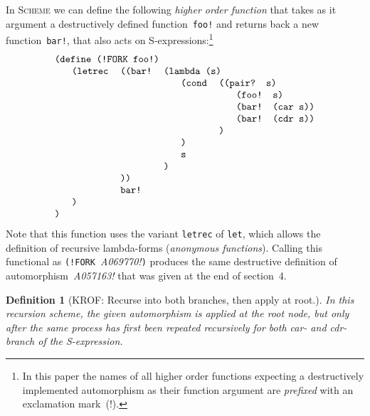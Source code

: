 \documentclass[11pt]{article} %
\newcommand{\eeq}{\end{equation}}
\newcommand{\beql}[1]{\begin{equation}\label{#1}}
\newcommand{\autname}[1]{{\it *#1}}
\newcommand{\autletter}[1]{$#1$}
\newcommand{\automorphismlet}[1]{automorphism~\autletter{#1}}
\newcommand{\automorphism}[1]{automorphism~\autname{#1}}
\newcommand{\proglangname}[1]{{\textsc{#1}}}
\newcommand{\scmsym}[1]{{\tt{#1}}}
\newcommand{\scmcode}[1]{{\tt{#1}}}
\newtheorem{definition}[theorem]{Definition}
\newenvironment{scmdefinefun7}{\begin{tabular}{l l l l l l l}}{\end{tabular}}
\begin{document}
In \proglangname{Scheme} we can define the following {\em higher order function}
that takes as it argument a destructively defined
function~\scmsym{foo!} %
and returns back a new function~\scmsym{bar!}, that also acts
on S-expressions:\footnote{In this paper the names of all higher
order functions expecting a destructively implemented automorphism
as their function argument are {\em prefixed} with an exclamation mark~(!).}
\beql{definerecscheme0} 
\begin{scmdefinefun7}
\multicolumn{7}{l}{\scmcode{(define (!FORK foo!)}}\\
 & \scmcode{(letrec} & \scmcode{((bar!} & \multicolumn{4}{l}{\scmcode{(lambda (s)}}\\
 & & & & \scmcode{(cond} & \multicolumn{2}{l}{\scmcode{((pair? s)}}\\
 & & & & & & \scmcode{(foo! s)}\\
 & & & & & & \scmcode{(bar! (car s))}\\
 & & & & & & \scmcode{(bar! (cdr s))}\\
 & & & & & \scmcode{)}\\ %
 & & & & \scmcode{)}\\ %
 & & & & \scmcode{s}\\
 & & & \scmcode{)}\\ %
 & & \scmcode{))}\\ %
 & & \scmcode{bar!}\\ 
 & \scmcode{)}\\  %
\scmcode{)}\\ %
\end{scmdefinefun7}
\eeq
Note that this function uses the variant \scmsym{letrec} of
\scmsym{let}, which allows the definition of recursive
lambda-forms ({\em anonymous functions}).
Calling this functional as \scmcode{(!FORK }\autname{A069770!}\scmcode{)}
produces the same destructive definition of \automorphism{A057163!}
that was given at the end of section~4.

\begin{definition}[{KROF: Recurse into both branches, then apply at root.}]
\normalfont
In this recursion scheme, the given automorphism %
is applied at the root node, but only {\em after} the same process
has first been repeated recursively for both car- and cdr-branch
of the S-expression.
\end{definition}
\end{document}
